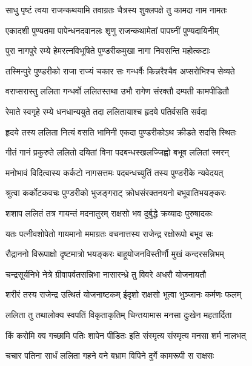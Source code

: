 
\twolineshloka
{साधु पृष्टं त्वया राजन्कथयामि तवाग्रतः}
{चैत्रस्य शुक्लपक्षे तु कामदा नाम नामतः}%

\twolineshloka
{एकादशी पुण्यतमा पापेन्धनदवानलः}
{शृणु राजन्कथामेतां पापघ्नीं पुण्यदायिनीम्}%

\twolineshloka
{पुरा नागपुरे रम्ये हेमरत्नविभूषिते}
{पुण्डरीकमुखा नागा निवसन्ति महोत्कटाः}%

\twolineshloka
{तस्मिन्पुरे पुण्डरीको राजा राज्यं चकार सः}
{गन्धर्वैः किन्नरैश्चैव अप्सरोभिश्च सेव्यते}%

\twolineshloka
{वराप्सरास्तु ललिता गन्धर्वो ललितस्तथा}
{उभौ रागेण संरक्तौ दम्पती कामपीडितौ}%

\twolineshloka
{रेमाते स्वगृहे रम्ये धनधान्ययुते तदा}
{ललितायाश्च हृदये पतिर्वसति सर्वदा}%

\twolineshloka
{हृदये तस्य ललिता नित्यं वसति भामिनी}
{एकदा पुण्डरीकोऽथ क्रीडते सदसि स्थितः}%

\twolineshloka
{गीतं गानं प्रकुरुते ललितो दयितां विना}
{पदबन्धस्खलज्जिह्वो बभूव ललितां स्मरन्}%

\twolineshloka
{मनोभावं विदित्वास्य कर्कटो नागसत्तमः}
{पदबन्धच्युतिं तस्य पुण्डरीके न्यवेदयत्}%

\twolineshloka
{श्रुत्वा कर्कोटकवचः पुण्डरीको भुजङ्गराट्}
{क्रोधसंरक्तनयनो बभूवातिभयङ्करः}%

\twolineshloka
{शशाप ललितं तत्र गायन्तं मदनातुरम्}
{राक्षसो भव दुर्बुद्धे क्रव्यादः पुरुषादकः}%

\twolineshloka
{यतः पत्नीवशोपेतो गायमानो ममाग्रतः}
{वचनात्तस्य राजेन्द्र रक्षोरूपो बभूव सः}%

\twolineshloka
{रौद्राननो विरूपाक्षो दृष्टमात्रो भयङ्करः}
{बाहूयोजनविस्तीर्णौ मुखं कन्दरसन्निभम्}%

\twolineshloka
{चन्द्रसूर्यनिभे नेत्रे ग्रीवापर्वतसन्निभा}
{नासारन्ध्रे तु विवरे अधरौ योजनायतौ}%

\twolineshloka
{शरीरं तस्य राजेन्द्र उत्थितं योजनाष्टकम्}
{ईदृशो राक्षसो भूत्वा भुञ्जानः कर्मणः फलम्}%

\twolineshloka
{ललिता तु तथालोक्य स्वपतिं विकृताकृतिम्}
{चिन्तयामास मनसा दुःखेन महतार्दिता}%

\twolineshloka
{किं करोमि क्व गच्छामि पतिः शापेन पीडितः}
{इति संस्मृत्य संस्मृत्य मनसा शर्म नालभत्}%

\twolineshloka
{चचार पतिना सार्धं ललिता गहने वने}
{बभ्राम विपिने दुर्गे कामरूपी स राक्षसः}%

